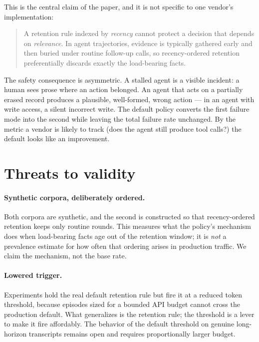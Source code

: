 \documentclass[11pt]{article}
\begin{document}
This is the central claim of the paper, and it is not specific to one vendor's
implementation:

\begin{quote}
A retention rule indexed by \emph{recency} cannot protect a decision that depends
on \emph{relevance}. In agent trajectories, evidence is typically gathered early
and then buried under routine follow-up calls, so recency-ordered retention
preferentially discards exactly the load-bearing facts.
\end{quote}

The safety consequence is asymmetric. A stalled agent is a visible incident: a
human sees prose where an action belonged. An agent that acts on a partially
erased record produces a plausible, well-formed, wrong action --- in an agent with
write access, a silent incorrect write. The default policy converts the first
failure mode into the second while leaving the total failure rate unchanged. By
the metric a vendor is likely to track (does the agent still produce tool calls?)
the default looks like an improvement.

\section{Threats to validity}
\label{sec:threats}

\paragraph{Synthetic corpora, deliberately ordered.}
Both corpora are synthetic, and the second is constructed so that recency-ordered
retention keeps only routine rounds. This measures what the policy's mechanism does
when load-bearing facts age out of the retention window; it is \emph{not} a
prevalence estimate for how often that ordering arises in production traffic. We
claim the mechanism, not the base rate.

\paragraph{Lowered trigger.}
Experiments hold the real default retention rule but fire it at a reduced token
threshold, because episodes sized for a bounded API budget cannot cross the
production default. What generalizes is the retention rule; the threshold is a
lever to make it fire affordably. The behavior of the default threshold on genuine
long-horizon transcripts remains open and requires proportionally larger budget.
\end{document}

